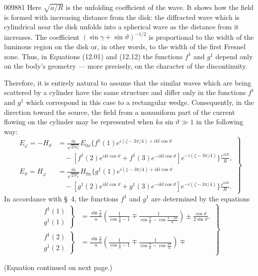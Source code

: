 \begin{scanpage}{0098}{81}
Here $\sqrt{a/R}$ is the unfolding coefficient of the wave. It shows how the field is formed with increasing distance from the disk: the diffracted wave which is cylindrical near the disk unfolds into a spherical wave as the distance from it increases. The coefficient $(\sin\gamma+\sin\vartheta)^{-1/2}$ is proportional to the width of the luminous region on the disk or, in other words, to the width of the first Fresnel zone. Thus, in Equations (12.01) and (12.12) the functions $f^1$ and $g^1$ depend only on the body's geometry --- more precisely, on the character of the discontinuity.

Therefore, it is entirely natural to assume that the similar waves which are being scattered by a cylinder have the same structure and differ only in the functions $f^1$ and $g^1$ which correspond in this case to a rectangular wedge. Consequently, in the direction toward the source, the field from a nonuniform part of the current flowing on the cylinder may be represented when $ka\sin\vartheta\gg1$ in the following way:
\[
\left.\begin{aligned}
E_\varphi=-H_\vartheta&=\frac{ia}{\sqrt{2\pi\zeta}}E_{0x}\{f^1(1)e^{i(\zeta-3\pi/4)+ikl\cos\vartheta}\\
&\quad-[f^1(2)e^{ikl\cos\vartheta}+f^1(3)e^{-ikl\cos\vartheta}]e^{-i(\zeta-3\pi/4)}\}\frac{e^{ikR}}R,\\
E_\vartheta=H_\varphi&=\frac{ia}{\sqrt{2\pi\zeta}}H_{0x}\{g^1(1)e^{i(\zeta-3\pi/4)+ikl\cos\vartheta}\\
&\quad-[g^1(2)e^{ikl\cos\vartheta}+g^1(3)e^{-ikl\cos\vartheta}]e^{-i(\zeta-3\pi/4)}\}\frac{e^{ikR}}R.
\end{aligned}\right\}\tag{14.02}
\]
In accordance with \S\ 4, the functions $f^1$ and $g^1$ are determined by the equations
\[
\left.\begin{aligned}
\left.\begin{matrix}f^1(1)\\g^1(1)\end{matrix}\right\}
&=\frac{\sin\frac\pi n}n\left(\frac1{\cos\frac\pi n-1}\mp\frac1{\cos\frac\pi n-\cos\frac{\pi-2\vartheta}n}\right)\pm\frac{\cos\vartheta}{2\sin\vartheta},\\
\left.\begin{matrix}f^1(2)\\g^1(2)\end{matrix}\right\}
&=\frac{\sin\frac\pi n}n\left(\frac1{\cos\frac\pi n-1}\mp\frac1{\cos\frac\pi n-\cos\frac{2\vartheta}n}\right)\mp
\end{aligned}\right\}\tag{14.03}
\]
\begin{center}(Equation continued on next page.)\end{center}
\end{scanpage}
